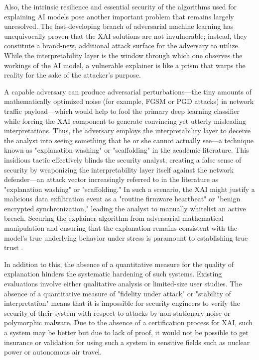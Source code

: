 \documentclass[12pt]{article}
\begin{document}
Also, the intrinsic resilience and essential security of the algorithms used for explaining AI models pose another important problem that remains largely unresolved. The fast-developing branch of adversarial machine learning has unequivocally proven that the XAI solutions are not invulnerable; instead, they constitute a brand-new, additional attack surface for the adversary to utilize. While the interpretability layer is the window through which one observes the workings of the AI model, a vulnerable explainer is like a prism that warps the reality for the sake of the attacker's purpose.

A capable adversary can produce adversarial perturbations—the tiny amounts of mathematically optimized noise (for example, FGSM or PGD attacks) in network traffic payload—which would help to fool the primary deep learning classifier while forcing the XAI component to generate convincing yet utterly misleading interpretations. Thus, the adversary employs the interpretability layer to deceive the analyst into seeing something that he or she cannot actually see—a technique known as "explanation washing" or "scaffolding" in the academic literature. This insidious tactic effectively blinds the security analyst, creating a false sense of security by weaponizing the interpretability layer itself against the network defender—an attack vector increasingly referred to in the literature as "explanation washing" or "scaffolding." In such a scenario, the XAI might justify a malicious data exfiltration event as a "routine firmware heartbeat" or "benign encrypted synchronization," leading the analyst to manually whitelist an active breach. Securing the explainer algorithm from adversarial mathematical manipulation and ensuring that the explanation remains consistent with the model’s true underlying behavior under stress is paramount to establishing true trust \cite{ieee2024limeshap, nguyen2022explainable}.

In addition to this, the absence of a quantitative measure for the quality of explanation hinders the systematic hardening of such systems. Existing evaluations involve either qualitative analysis or limited-size user studies. The absence of a quantitative measure of "fidelity under attack" or "stability of interpretation" means that it is impossible for security engineers to verify the security of their system with respect to attacks by non-stationary noise or polymorphic malware. Due to the absence of a certification process for XAI, such a system may be better but due to lack of proof, it would not be possible to get insurance or validation for using such a system in sensitive fields such as nuclear power or autonomous air travel.
\end{document}

